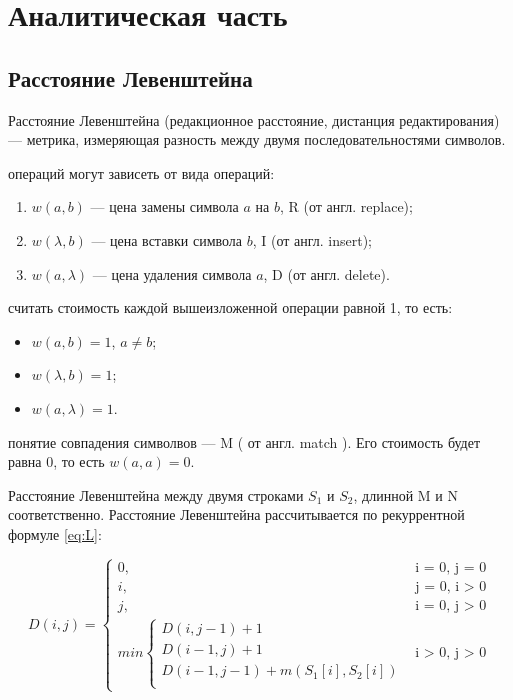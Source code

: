 \chapter{Аналитическая часть}
\section{Расстояние Левенштейна}

Расстояние Левенштейна (редакционное расстояние, дистанция редактирования) --- метрика, измеряющая разность между двумя последовательностями символов.

 операций могут зависеть от вида операций:
\begin{enumerate}
	\item $w(a, b)$ --- цена замены символа $a$ на $b$, R (от англ. replace);
	\item $w(\lambda, b)$ --- цена вставки символа $b$, I (от англ. insert);
	\item $w(a, \lambda)$ --- цена удаления символа $a$, D (от англ. delete).
\end{enumerate}

 считать стоимость каждой вышеизложенной операции равной 1, то есть:
\begin{itemize}
	\item $w(a, b) = 1$, $a \neq b$;
	\item $w(\lambda, b) = 1$;
	\item $w(a, \lambda) = 1$.
\end{itemize}

 понятие совпадения символвов --- M ( от англ. match ). Его стоимость будет равна 0, то есть $w(a, a) = 0$.

Расстояние Левенштейна между двумя строками $S_{1}$ и $S_{2}$, длинной M и N соответственно. Расстояние Левенштейна рассчитывается по рекуррентной формуле \ref{eq:L}:

\begin{equation}
	\label{eq:L}
	D(i, j) =
	\begin{cases}
		0, &\text{i = 0, j = 0}\\
		i, &\text{j = 0, i > 0}\\
		j, &\text{i = 0, j > 0}\\
		min \begin{cases}
			D(i, j - 1) + 1\\
			D(i - 1, j) + 1\\
			D(i - 1, j - 1) +  m(S_{1}[i], S_{2}[i]) \\
		\end{cases}
		&\text{i > 0, j > 0}
	\end{cases}
\end{equation}

